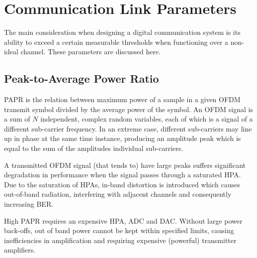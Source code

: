 
\section{Communication Link Parameters}
The main consideration when designing a digital communication system is its ability to exceed a certain measurable thresholds when functioning over a non-ideal channel\cite{hayk}. These parameters are discussed here.

\subsection{Peak-to-Average Power Ratio}
\gls{PAPR} is the relation between maximum power of a sample in a given \gls{OFDM} transmit symbol divided by the average power of the symbol\cite{french}. An OFDM signal is a sum of \(N\) independent, complex random variables, each of which is a signal of a different sub-carrier frequency. In an extreme case, different sub-carriers may line up in phase at the same time instance, producing an amplitude peak which is equal to the sum of the amplitudes individual sub-carriers.

A transmitted OFDM signal (that tends to) have large peaks suffers significant degradation in performance when the signal passes through a saturated \gls{HPA}. Due to the saturation of \gls{HPA}s, in-band distortion is introduced which causes out-of-band radiation, interfering with adjacent channels\cite{prob} and consequently increasing \gls{BER}.

High \gls{PAPR} requires an expensive \gls{HPA}, \gls{ADC} and \gls{DAC}. Without large power back-offs, out of band power cannot be kept within specified limits, causing inefficiencies in amplification and requiring expensive (powerful) transmitter amplifiers.

